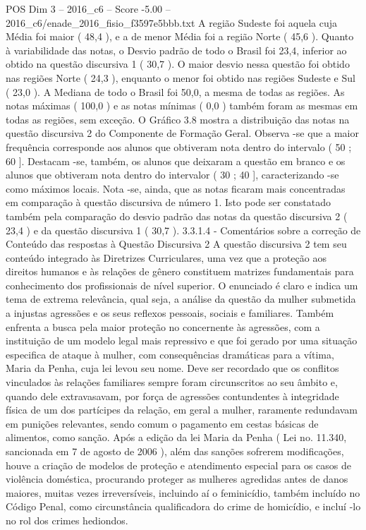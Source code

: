 \begin{textsample}{POS Dim 3 – 2016\_c6 – Score -5.00 – 2016\_c6/enade\_2016\_fisio\_f3597e5bbb.txt}
A região Sudeste foi aquela cuja Média foi maior ( 48,4 ), e a de menor Média foi a região Norte ( 45,6 ).
Quanto à variabilidade das notas, o Desvio padrão de todo o Brasil foi 23,4, inferior ao obtido na questão discursiva 1 ( 30,7 ).
O maior desvio nessa questão foi obtido nas regiões Norte ( 24,3 ), enquanto o menor foi obtido nas regiões Sudeste e Sul ( 23,0 ).
A Mediana de todo o Brasil foi 50,0, a mesma de todas as regiões.
As notas máximas ( 100,0 ) e as notas mínimas ( 0,0 ) também foram as mesmas em todas as regiões, sem exceção.
O Gráfico 3.8 mostra a distribuição das notas na questão discursiva 2 do Componente de Formação Geral.
Observa -se que a maior frequência corresponde aos alunos que obtiveram nota dentro do intervalo ( 50 ; 60 ].
Destacam -se, também, os alunos que deixaram a questão em branco e os alunos que obtiveram nota dentro do intervalor ( 30 ; 40 ], caracterizando -se como máximos locais.
Nota -se, ainda, que as notas ficaram mais concentradas em comparação à questão discursiva de número 1.
Isto pode ser constatado também pela comparação do desvio padrão das notas da questão discursiva 2 ( 23,4 ) e da questão discursiva 1 ( 30,7 ). 3.3.1.4 - Comentários sobre a correção de Conteúdo das respostas à Questão Discursiva 2 A questão discursiva 2 tem seu conteúdo integrado às Diretrizes Curriculares, uma vez que a proteção aos direitos humanos e às relações de gênero constituem matrizes fundamentais para conhecimento dos profissionais de nível superior.
O enunciado é claro e indica um tema de extrema relevância, qual seja, a análise da questão da mulher submetida a injustas agressões e os seus reflexos pessoais, sociais e familiares.
Também enfrenta a busca pela maior proteção no concernente às agressões, com a instituição de um modelo legal mais repressivo e que foi gerado por uma situação especifica de ataque à mulher, com consequências dramáticas para a vítima, Maria da Penha, cuja lei levou seu nome.
Deve ser recordado que os conflitos vinculados às relações familiares sempre foram circunscritos ao seu âmbito e, quando dele extravasavam, por força de agressões contundentes à integridade física de um dos partícipes da relação, em geral a mulher, raramente redundavam em punições relevantes, sendo comum o pagamento em cestas básicas de alimentos, como sanção.
Após a edição da lei Maria da Penha ( Lei no. 11.340, sancionada em 7 de agosto de 2006 ), além das sanções sofrerem modificações, houve a criação de modelos de proteção e atendimento especial para os casos de violência doméstica, procurando proteger as mulheres agredidas antes de danos maiores, muitas vezes irreversíveis, incluindo aí o feminicídio, também incluído no Código Penal, como circunstância qualificadora do crime de homicídio, e incluí -lo no rol dos crimes hediondos.

\end{textsample}
